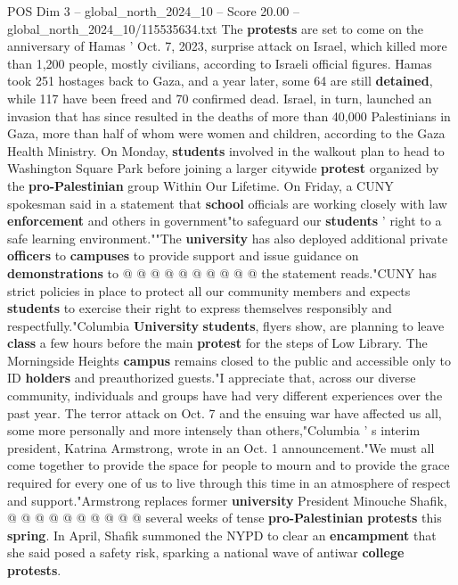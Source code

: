 \begin{textsample}{POS Dim 3 – global\_north\_2024\_10 – Score 20.00 – global\_north\_2024\_10/115535634.txt}  \label{ex:f3_pos_125}
The \textbf{protests} are set to come on the anniversary of Hamas ' Oct. 7, 2023, surprise attack on Israel, which killed more than 1,200 people, mostly civilians, according to Israeli official figures.
Hamas took 251 hostages back to Gaza, and a year later, some 64 are still \textbf{detained}, while 117 have been freed and 70 confirmed dead.
Israel, in turn, launched an invasion that has since resulted in the deaths of more than 40,000 Palestinians in Gaza, more than half of whom were women and children, according to the Gaza Health Ministry.
On Monday, \textbf{students} involved in the walkout plan to head to Washington Square Park before joining a larger citywide \textbf{protest} organized by the \textbf{pro-Palestinian} group Within Our Lifetime.
On Friday, a CUNY spokesman said in a statement that \textbf{school} officials are working closely with law \textbf{enforcement} and others in government"to safeguard our \textbf{students} ' right to a safe learning environment.""The \textbf{university} has also deployed additional private \textbf{officers} to \textbf{campuses} to provide support and issue guidance on \textbf{demonstrations} to @ @ @ @ @ @ @ @ @ @ the statement reads."CUNY has strict policies in place to protect all our community members and expects \textbf{students} to exercise their right to express themselves responsibly and respectfully."Columbia \textbf{University} \textbf{students}, flyers show, are planning to leave \textbf{class} a few hours before the main \textbf{protest} for the steps of Low Library.
The Morningside Heights \textbf{campus} remains closed to the public and accessible only to ID \textbf{holders} and preauthorized guests."I appreciate that, across our diverse community, individuals and groups have had very different experiences over the past year.
The terror attack on Oct. 7 and the ensuing war have affected us all, some more personally and more intensely than others,"Columbia ' s interim president, Katrina Armstrong, wrote in an Oct. 1 announcement."We must all come together to provide the space for people to mourn and to provide the grace required for every one of us to live through this time in an atmosphere of respect and support."Armstrong replaces former \textbf{university} President Minouche Shafik, @ @ @ @ @ @ @ @ @ @ several weeks of tense \textbf{pro-Palestinian} \textbf{protests} this \textbf{spring}.
In April, Shafik summoned the NYPD to clear an \textbf{encampment} that she said posed a safety risk, sparking a national wave of antiwar \textbf{college} \textbf{protests}.

\end{textsample}
